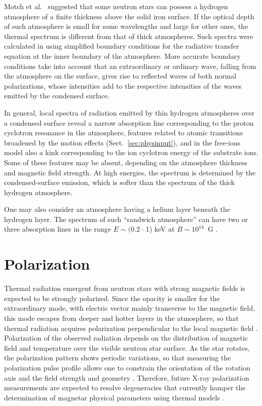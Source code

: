 \documentclass{pos1}
\begin{document}
Motch et al.~\cite{MotchZH03} suggested that some neutron stars can possess a
hydrogen atmosphere of a finite thickness above the solid iron
surface. If the optical depth of such atmosphere is small for some
wavelengths and large for other ones, the thermal spectrum is
different from that of thick atmospheres. Such spectra were calculated
in \cite{Ho_ea07,SuleimanovPW09,Suleimanov_ea10} using simplified
boundary conditions for the radiative transfer equation at the inner
boundary of the atmosphere. More accurate boundary conditions
\cite{reflefit} take into account that an extraordinary or ordinary
wave, falling from the atmosphere on the surface, gives rise to
reflected waves of both normal polarizations, whose intensities add to
the respective intensities of the waves emitted by the condensed
surface.

In general, local spectra of radiation emitted by thin hydrogen
atmospheres over a condensed surface reveal a narrow absorption line
corresponding to the proton cyclotron resonance in the atmosphere,
features related to atomic transitions broadened by the motion effects
(Sect.~\ref{sec:physinput}), and in the free-ions model also
a kink corresponding to the ion
cyclotron energy of the substrate ions.  Some of these features may be
absent, depending on the atmosphere thickness and magnetic field
strength. At high energies, the spectrum is determined by the
condensed-surface emission, which is softer than the spectrum of the
thick hydrogen atmosphere.

One may also consider an atmosphere having a helium layer
beneath the hydrogen layer. The spectrum of such ``sandwich
atmosphere'' can have two or three absorption
lines in the range $E\sim(0.2$\,--\,1) keV at $B\sim10^{14}$~G
\cite{SuleimanovPW09}.

\section{Polarization}
\label{sec:pol}

Thermal radiation emergent from neutron stars with strong magnetic
fields is expected to be strongly polarized. Since the opacity is
smaller for the extraordinary mode, with electric vector mainly
transverse to the magnetic field, this mode escapes from deeper and
hotter layers in the atmosphere, so that thermal radiation acquires
polarization perpendicular to the local magnetic field
\cite{PavlovShibanov78}. Polarization of the observed radiation
depends on the distribution of magnetic field and temperature over the
visible neutron star surface. As the star rotates, the polarization
pattern shows periodic variations, so that measuring the polarization
pulse profile allows one to constrain the orientation of the rotation
axis and the field strength and geometry \cite{PavlovZavlin00,LaiHo03a}.
Therefore, future X-ray polarization measurements are expected to
resolve degeneracies that currently hamper the determination of
magnetar physical parameters using thermal models
\cite{vanAdelsbergPerna09,Taverna_ea14}. 
\end{document}
